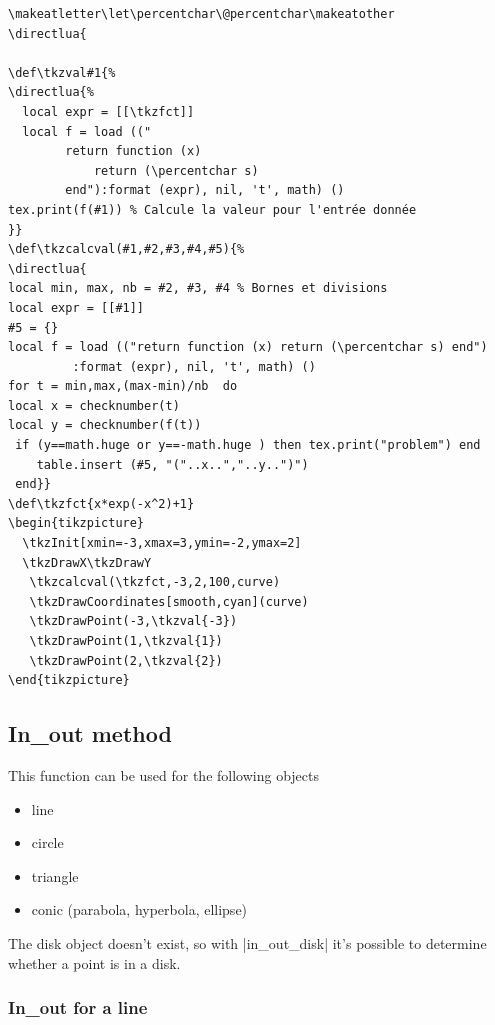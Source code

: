 \begin{Verbatim}
\makeatletter\let\percentchar\@percentchar\makeatother
\directlua{

\def\tkzval#1{%
\directlua{%
  local expr = [[\tkzfct]] 
  local f = load (("
        return function (x)
            return (\percentchar s)
        end"):format (expr), nil, 't', math) ()
tex.print(f(#1)) % Calcule la valeur pour l'entrée donnée
}}
\def\tkzcalcval(#1,#2,#3,#4,#5){%
\directlua{
local min, max, nb = #2, #3, #4 % Bornes et divisions
local expr = [[#1]]
#5 = {}
local f = load (("return function (x) return (\percentchar s) end")
         :format (expr), nil, 't', math) ()
for t = min,max,(max-min)/nb  do
local x = checknumber(t)
local y = checknumber(f(t))
 if (y==math.huge or y==-math.huge ) then tex.print("problem") end
    table.insert (#5, "("..x..","..y..")")  
 end}}
\def\tkzfct{x*exp(-x^2)+1}
\begin{tikzpicture}
  \tkzInit[xmin=-3,xmax=3,ymin=-2,ymax=2]
  \tkzDrawX\tkzDrawY
   \tkzcalcval(\tkzfct,-3,2,100,curve)
   \tkzDrawCoordinates[smooth,cyan](curve)
   \tkzDrawPoint(-3,\tkzval{-3})
   \tkzDrawPoint(1,\tkzval{1})
   \tkzDrawPoint(2,\tkzval{2})
\end{tikzpicture}
\end{Verbatim}



\subsection{In\_out method} %
\label{sub:in_out_method}

This function can be used for the following objects
\begin{itemize}
   \item line
   \item circle 
   \item triangle
   \item conic (parabola, hyperbola, ellipse)
\end{itemize}
 The disk object doesn't exist, so with |in\_out\_disk| it's possible to determine whether a point is in a disk.

\subsubsection{In\_out for a line} %
\label{ssub:in_out_for_a_line}

